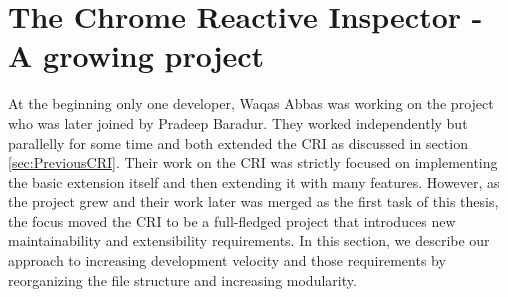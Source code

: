 \section{The Chrome Reactive Inspector - A growing project}
At the beginning only one developer, Waqas Abbas was working on the project who was later joined by Pradeep Baradur. They worked independently but parallelly for some time and both extended the CRI as discussed in section \ref{sec:PreviousCRI}. Their work on the CRI was strictly focused on implementing the basic extension itself and then extending it with many features. However, as the project grew and their work later was merged as the first task of this thesis, the focus moved the CRI to be a full-fledged project that introduces new maintainability and extensibility requirements. In this section, we describe our approach to increasing development velocity and those requirements by reorganizing the file structure and increasing modularity.

